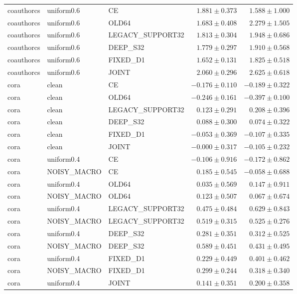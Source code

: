 \begin{longtable}{lllrr}
coauthorcs & uniform0.6 & CE & $1.881 \pm 0.373$ & $1.588 \pm 1.000$ \\
coauthorcs & uniform0.6 & OLD64 & $1.683 \pm 0.408$ & $2.279 \pm 1.505$ \\
coauthorcs & uniform0.6 & LEGACY\_SUPPORT32 & $1.813 \pm 0.304$ & $1.948 \pm 0.686$ \\
coauthorcs & uniform0.6 & DEEP\_S32 & $1.779 \pm 0.297$ & $1.910 \pm 0.568$ \\
coauthorcs & uniform0.6 & FIXED\_D1 & $1.652 \pm 0.131$ & $1.825 \pm 0.518$ \\
coauthorcs & uniform0.6 & JOINT & $2.060 \pm 0.296$ & $2.625 \pm 0.618$ \\
cora & clean & CE & $-0.176 \pm 0.110$ & $-0.189 \pm 0.322$ \\
cora & clean & OLD64 & $-0.246 \pm 0.161$ & $-0.397 \pm 0.100$ \\
cora & clean & LEGACY\_SUPPORT32 & $0.123 \pm 0.291$ & $0.208 \pm 0.396$ \\
cora & clean & DEEP\_S32 & $0.088 \pm 0.300$ & $0.074 \pm 0.322$ \\
cora & clean & FIXED\_D1 & $-0.053 \pm 0.369$ & $-0.107 \pm 0.335$ \\
cora & clean & JOINT & $-0.000 \pm 0.317$ & $-0.105 \pm 0.232$ \\
cora & uniform0.4 & CE & $-0.106 \pm 0.916$ & $-0.172 \pm 0.862$ \\
cora & NOISY\_MACRO & CE & $0.185 \pm 0.545$ & $-0.058 \pm 0.688$ \\
cora & uniform0.4 & OLD64 & $0.035 \pm 0.569$ & $0.147 \pm 0.911$ \\
cora & NOISY\_MACRO & OLD64 & $0.123 \pm 0.507$ & $0.067 \pm 0.674$ \\
cora & uniform0.4 & LEGACY\_SUPPORT32 & $0.475 \pm 0.484$ & $0.629 \pm 0.843$ \\
cora & NOISY\_MACRO & LEGACY\_SUPPORT32 & $0.519 \pm 0.315$ & $0.525 \pm 0.276$ \\
cora & uniform0.4 & DEEP\_S32 & $0.281 \pm 0.351$ & $0.312 \pm 0.525$ \\
cora & NOISY\_MACRO & DEEP\_S32 & $0.589 \pm 0.451$ & $0.431 \pm 0.495$ \\
cora & uniform0.4 & FIXED\_D1 & $0.229 \pm 0.449$ & $0.401 \pm 0.462$ \\
cora & NOISY\_MACRO & FIXED\_D1 & $0.299 \pm 0.244$ & $0.318 \pm 0.340$ \\
cora & uniform0.4 & JOINT & $0.141 \pm 0.351$ & $0.200 \pm 0.358$ \\

\end{longtable}
